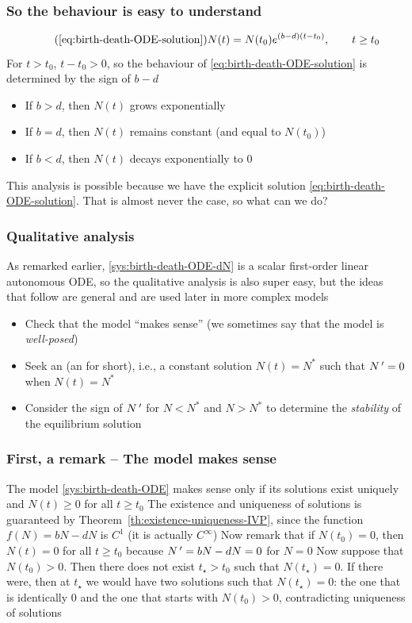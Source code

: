 \documentclass[aspectratio=169]{beamer}
\begin{document}
\begin{frame}\frametitle{So the behaviour is easy to understand}
\begin{equation}
\tag{\ref{eq:birth-death-ODE-solution}}
N(t)=N(t_0)e^{(b-d)(t-t_0)},\qquad t\geq t_0
\end{equation}
\vfill
For $t>t_0$, $t-t_0>0$, so the behaviour of \eqref{eq:birth-death-ODE-solution} is determined by the sign of $b-d$
\vfill
\begin{itemize}
\item If $b>d$, then $N(t)$ grows exponentially
\item If $b=d$, then $N(t)$ remains constant (and equal to $N(t_0)$)
\item If $b<d$, then $N(t)$ decays exponentially to 0
\end{itemize}
\vfill
This analysis is possible because we have the explicit solution \eqref{eq:birth-death-ODE-solution}. That is almost never the case, so what can we do?
\end{frame}

\begin{frame}\frametitle{Qualitative analysis}
As remarked earlier, \eqref{sys:birth-death-ODE-dN} is a scalar first-order linear autonomous ODE, so the qualitative analysis is also super easy, but the ideas that follow are general and are used later in more complex models
\vfill
\begin{itemize}
\item Check that the model ``makes sense'' (we sometimes say that the model is \emph{well-posed})
\item Seek an  (an  for short), i.e., a constant solution $N(t)=N^*$ such that $N\,'=0$ when $N(t)=N^*$
\item Consider the sign of $N\,'$ for $N<N^*$ and $N>N^*$ to determine the \emph{stability} of the equilibrium solution
\end{itemize}
\end{frame}

\begin{frame}\frametitle{First, a remark -- The model makes sense}
The model \eqref{sys:birth-death-ODE} makes sense only if its solutions exist uniquely and $N(t)\geq 0$ for all $t\geq t_0$
\vfill
The existence and uniqueness of solutions is guaranteed by Theorem~\ref{th:existence-uniqueness-IVP}, since the function $f(N)=bN-dN$ is $C^1$ (it is actually $C^\infty$)
\vfill
Now remark that if $N(t_0)=0$, then $N(t)=0$ for all $t\geq t_0$ because $N\,'=bN-dN=0$ for $N=0$
\vfill
Now suppose that $N(t_0)>0$. Then there does not exist $t_\star>t_0$ such that $N(t_\star)=0$. 
If there were, then at $t_\star$ we would have two solutions such that $N(t_\star)=0$: the one that is identically 0 and the one that starts with $N(t_0)>0$, contradicting uniqueness of solutions
\end{frame}
\end{document}

